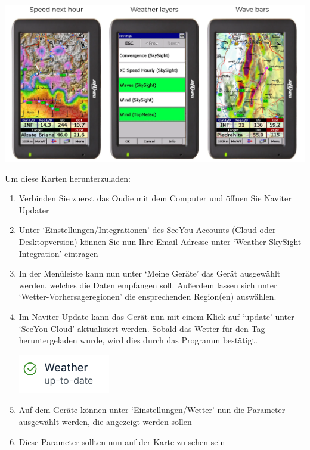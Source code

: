 \documentclass[11pt,a4paper]{article}
\begin{document}
\begin{center}
\includegraphics[width=16cm]{images/oudie.png}
\end{center}

Um diese Karten herunterzuladen: 

\begin{enumerate}
\item Verbinden Sie zuerst das Oudie mit dem Computer und öffnen Sie Naviter Updater
\item Unter `Einstellungen/Integrationen' des SeeYou Accounts (Cloud oder Desktopversion) können Sie nun Ihre Email Adresse unter `Weather SkySight Integration' eintragen 



\item In der Menüleiste kann nun unter `Meine Geräte' das Gerät ausgewählt werden, welches die Daten empfangen soll. Außerdem lassen sich unter `Wetter-Vorhersageregionen' die ensprechenden Region(en) auswählen.
\item Im Naviter Update kann das Gerät nun mit einem Klick auf `update' unter `SeeYou Cloud' aktualisiert werden. Sobald das Wetter für den Tag heruntergeladen wurde, wird dies durch das Programm bestätigt.

\begin{center}
\includegraphics[width=4cm]{images/weather_downloaded.png}
\end{center}
 
\item Auf dem Geräte können unter `Einstellungen/Wetter' nun die Parameter ausgewählt werden, die angezeigt werden sollen 
\item Diese Parameter sollten nun auf der Karte zu sehen sein

\end{enumerate}
\end{document}
